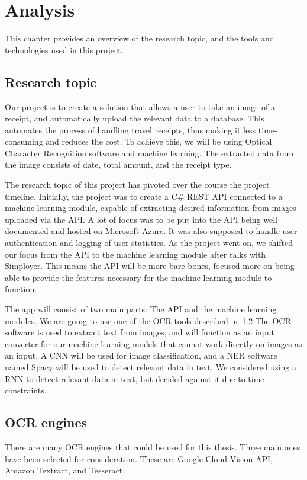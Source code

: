 \cleardoublepage
\chapter{Analysis}
\label{ch:analysis}
This chapter provides an overview of the research topic, and the tools and technologies used in this project.

\section{Research topic}\label{sec:research-topic}
Our project is to create a solution that allows a user to take an image of a receipt, and automatically upload the
relevant data to a database.
This automates the process of handling travel receipts, thus making it less time-consuming and reduces the cost.
To achieve this, we will be using Optical Character Recognition software and machine learning\@.
The extracted data from the image consists of date, total amount, and the receipt type.

The research topic of this project has pivoted over the course the project timeline.
Initially, the project was to create a C\# REST API connected to a machine learning module, capable of extracting desired information from images uploaded via the API.
A lot of focus was to be put into the API being well documented and hosted on Microsoft Azure.
It was also supposed to handle user authentication and logging of user statistics.
As the project went on, we shifted our focus from the API to the machine learning module after talks with Simployer.
This means the API will be more bare-bones, focused more on being able to provide the features necessary for the machine learning module to function.

The app will consist of two main parts: The API and the machine learning modules.
We are going to use one of the OCR tools described in~\ref{sec:ocr-engines}
The OCR software is used to extract text from images, and will function as an input converter for our machine learning models that cannot work directly on images as an input.
A CNN will be used for image classification, and a NER software named Spacy will be used to detect relevant data in text.
We considered using a RNN to detect relevant data in text, but decided against it due to time constraints.

\section{OCR engines}\label{sec:ocr-engines}
There are many OCR engines that could be used for this thesis.
Three main ones have been selected for consideration.
These are Google Cloud Vision API, Amazon Textract, and Tesseract.
